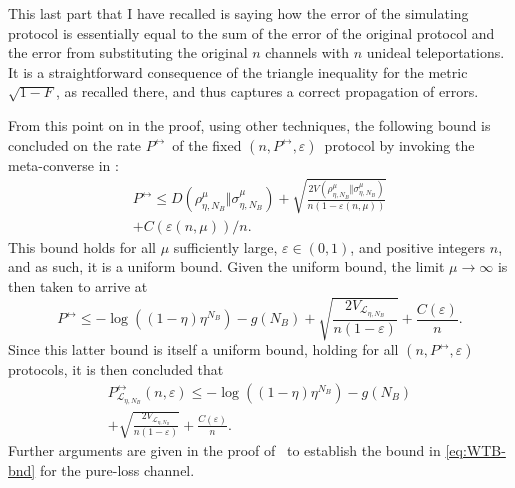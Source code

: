 \documentclass[apsrev,twocolumn]{revtex4-1}%
\begin{document}
This last part that I have recalled is saying how the error of the simulating
protocol is essentially equal to the sum of the error of the original protocol
and the error from substituting the original $n$ channels with $n$ unideal
teleportations. It is a straightforward consequence of the triangle inequality
for the metric $\sqrt{1-F}$, as recalled there, and thus captures a correct
propagation of errors.


From this point on in the proof, using other techniques,
the following bound is concluded on the rate $P^{\leftrightarrow}$\ of the
fixed $(n,P^{\leftrightarrow},\varepsilon)$\ protocol by invoking the
meta-converse in \cite[Theorem~11]{WTB16}:%
\begin{multline}
P^{\leftrightarrow}\leq D(\rho_{\eta,N_{B}}^{\mu}\Vert\sigma_{\eta,N_{B}}%
^{\mu})+\sqrt{\frac{2V(\rho_{\eta,N_{B}}^{\mu}\Vert\sigma_{\eta,N_{B}}^{\mu}%
)}{n(1-\varepsilon(n,\mu))}}\\
+C(\varepsilon(n,\mu))/n.
\end{multline}
This bound holds for all $\mu$ sufficiently large, $\varepsilon\in(0,1)$, and
positive integers $n$, and as such, it is a uniform bound. Given the uniform
bound, the limit $\mu\rightarrow\infty$ is then taken to arrive at%
\begin{equation}
P^{\leftrightarrow}\leq-\log\!\left(  \left(  1-\eta\right)  \eta^{N_{B}%
}\right)  -g(N_{B})+\sqrt{\frac{2V_{\mathcal{L}_{\eta,N_{B}}}}{n\left(
1-\varepsilon\right)  }}+\frac{C(\varepsilon)}{n}. \label{eq:final-bnd}%
\end{equation}
Since this latter bound is itself a uniform bound, holding for all
$(n,P^{\leftrightarrow},\varepsilon)$ protocols, it is then concluded that%
\begin{multline}
P_{\mathcal{L}_{\eta,N_{B}}}^{\leftrightarrow}(n,\varepsilon)\leq
-\log\!\left(  \left(  1-\eta\right)  \eta^{N_{B}}\right)  -g(N_{B})\\
+\sqrt{\frac{2V_{\mathcal{L}_{\eta,N_{B}}}}{n\left(  1-\varepsilon\right)  }%
}+\frac{C(\varepsilon)}{n}.
\end{multline}
Further arguments are given in the proof of \cite[Theorem~24]{WTB16}\ to
establish the bound in \eqref{eq:WTB-bnd} for the pure-loss channel.
\end{document}
